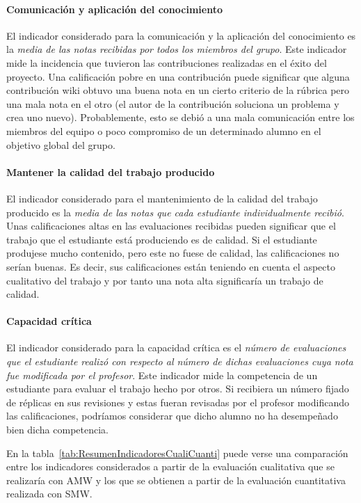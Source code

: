 \paragraph*{Comunicación y aplicación del conocimiento}
El indicador considerado para la comunicación y la aplicación del conocimiento es la \emph{media de las notas recibidas por todos los miembros del grupo}. Este indicador mide la incidencia que tuvieron las contribuciones realizadas en el éxito del proyecto. Una calificación pobre en una contribución puede significar  que alguna contribución wiki obtuvo una buena nota en un cierto criterio de la rúbrica pero una mala nota en el otro (el autor de la contribución soluciona un problema y crea uno nuevo). Probablemente, esto se debió a una mala comunicación entre los miembros del equipo o poco compromiso de un determinado alumno en el objetivo global del grupo. 

\paragraph*{Mantener la calidad del trabajo producido}
El indicador considerado para el mantenimiento de la calidad del trabajo producido es la \emph{media de las notas que cada estudiante individualmente recibió}. Unas calificaciones altas en las evaluaciones recibidas pueden significar que el trabajo que el estudiante está produciendo es de calidad. Si el estudiante produjese mucho contenido, pero este no fuese de calidad, las calificaciones no serían buenas. Es decir, sus calificaciones están teniendo en cuenta el aspecto cualitativo del trabajo y por tanto una nota alta significaría un trabajo de calidad.

\paragraph*{Capacidad crítica}
El indicador considerado para la capacidad crítica es el \emph{número de evaluaciones que el estudiante realizó con respecto al número de dichas evaluaciones cuya nota fue modificada por el profesor}. Este indicador mide la competencia de un estudiante para evaluar el trabajo hecho por otros. Si recibiera un número fijado de réplicas en sus revisiones y estas fueran revisadas por el profesor modificando las calificaciones, podríamos considerar que dicho alumno no ha desempeñado bien dicha competencia.

En la tabla~\ref{tab:ResumenIndicadoresCualiCuanti} puede verse una comparación entre los indicadores considerados a partir de la evaluación cualitativa que se realizaría con AMW y los que se obtienen a partir de la evaluación cuantitativa realizada con SMW.

